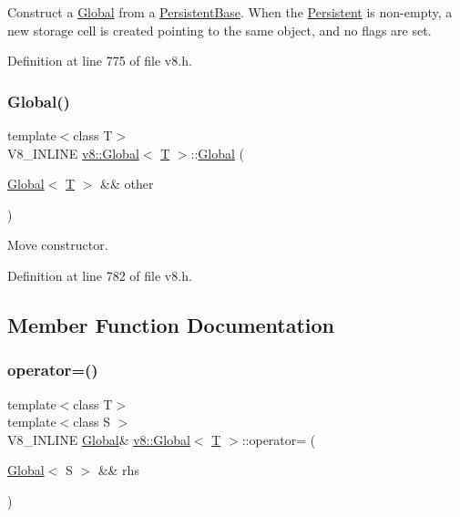 Construct a \mbox{\hyperlink{classv8_1_1Global}{Global}} from a \mbox{\hyperlink{classv8_1_1PersistentBase}{Persistent\+Base}}. When the \mbox{\hyperlink{classv8_1_1Persistent}{Persistent}} is non-\/empty, a new storage cell is created pointing to the same object, and no flags are set. 

Definition at line 775 of file v8.\+h.

\mbox{\label{classv8_1_1Global_ab8f3c754a58146e6db67012cd74a49cb}} 
\subsubsection{\texorpdfstring{Global()}{Global()}\hspace{0.1cm}{\footnotesize\ttfamily [4/4]}}
{\footnotesize\ttfamily template$<$class T$>$ \\
V8\+\_\+\+I\+N\+L\+I\+NE \mbox{\hyperlink{classv8_1_1Global}{v8\+::\+Global}}$<$ \mbox{\hyperlink{classv8_1_1internal_1_1torque_1_1T}{T}} $>$\+::\mbox{\hyperlink{classv8_1_1Global}{Global}} (\begin{DoxyParamCaption}\item[{\mbox{\hyperlink{classv8_1_1Global}{Global}}$<$ \mbox{\hyperlink{classv8_1_1internal_1_1torque_1_1T}{T}} $>$ \&\&}]{other }\end{DoxyParamCaption})\hspace{0.3cm}{\ttfamily [inline]}}

Move constructor. 

Definition at line 782 of file v8.\+h.



\subsection{Member Function Documentation}
\mbox{\label{classv8_1_1Global_a9d3d7d8f10ad23e413f2027cc15ab209}} 
\subsubsection{\texorpdfstring{operator=()}{operator=()}}
{\footnotesize\ttfamily template$<$class T$>$ \\
template$<$class S $>$ \\
V8\+\_\+\+I\+N\+L\+I\+NE \mbox{\hyperlink{classv8_1_1Global}{Global}}\& \mbox{\hyperlink{classv8_1_1Global}{v8\+::\+Global}}$<$ \mbox{\hyperlink{classv8_1_1internal_1_1torque_1_1T}{T}} $>$\+::operator= (\begin{DoxyParamCaption}\item[{\mbox{\hyperlink{classv8_1_1Global}{Global}}$<$ S $>$ \&\&}]{rhs }\end{DoxyParamCaption})\hspace{0.3cm}{\ttfamily [inline]}}

